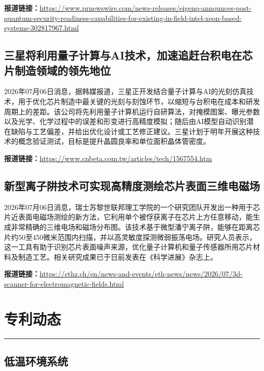 \documentclass[12pt,a4paper]{ctexart}
\begin{document}
\noindent\textbf{报道链接：}\url{https://www.prnewswire.com/news-releases/eigenq-announces-post-quantum-security-readiness-capabilities-for-existing-in-field-intel-xeon-based-systems-302817967.html}

\subsection{ 三星将利用量子计算与AI技术，加速追赶台积电在芯片制造领域的领先地位 }

2026年07月06日消息，据韩媒报道，三星正开发结合量子计算与AI的光刻仿真技术，用于优化芯片制造中最关键的光刻与刻蚀环节，以缩短与台积电在成本和研发周期上的差距。该公司将先利用量子计算机运行自研算法，对掩模图案、曝光参数以及光学、化学过程中的误差和形变进行高精度模拟；随后由AI模型自动识别潜在缺陷与工艺偏差，并给出优化设计或工艺修正建议。三星计划于明年开展这种技术的概念验证测试，目标是提升晶圆良率和单位面积晶体管密度。

\noindent\textbf{报道链接：}\url{https://www.cnbeta.com.tw/articles/tech/1567554.htm}

\subsection{ 新型离子阱技术可实现高精度测绘芯片表面三维电磁场 }

2026年07月06日消息，瑞士苏黎世联邦理工学院的一个研究团队开发出一种用于芯片近表面电磁场测绘的新方法，它利用单个被俘获离子在芯片上方任意移动，能生成非常精确的三维电场和磁场分布图。该技术基于微型潘宁离子阱，能够在距离芯片约50至450微米范围内扫描，并以高灵敏度探测微弱振荡电场。研究人员表示，这一工具有助于识别芯片表面噪声来源，优化量子计算机和量子传感器所用芯片材料及制造工艺。相关研究成果已于日前发表在《科学进展》杂志上。

\noindent\textbf{报道链接：}\url{https://ethz.ch/en/news-and-events/eth-news/news/2026/07/3d-scanner-for-electromagnetic-fields.html}



\newpage
\section{专利动态}
\vspace{-0.5em}
\noindent\rule{\linewidth}{1.5pt}

\subsection{ 低温环境系统 }
\end{document}
